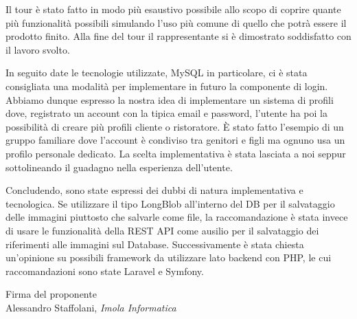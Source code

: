 \documentclass[a4paper, 11pt]{article}
\begin{document}
Il tour è stato fatto in modo più esaustivo possibile allo scopo di coprire quante più funzionalità possibili simulando l'uso più comune di quello che potrà essere il prodotto finito.
Alla fine del tour il rappresentante si è dimostrato soddisfatto con il lavoro svolto.

In seguito date le tecnologie utilizzate, MySQL in particolare, ci è stata consigliata una modalità per implementare in futuro la componente di login. Abbiamo dunque espresso la nostra idea di implementare un sistema di profili dove, registrato un account con la tipica email e password, l'utente ha poi la possibilità di creare più profili cliente o ristoratore. È stato fatto l'esempio di un gruppo familiare dove l'account è condiviso tra genitori e figli ma ognuno usa un profilo personale dedicato.
La scelta implementativa è stata lasciata a noi seppur sottolineando il guadagno nella esperienza dell'utente.

Concludendo, sono state espressi dei dubbi di natura implementativa e tecnologica.
Se utilizzare il tipo LongBlob all'interno del DB per il salvataggio delle immagini piuttosto che salvarle come file, la raccomandazione è stata invece di usare le funzionalità della REST API come ausilio per il salvataggio dei riferimenti alle immagini sul Database.
Successivamente è stata chiesta un'opinione su possibili framework da utilizzare lato backend con PHP, le cui raccomandazioni sono state Laravel e Symfony.

\vspace{60pt}
\begin{flushleft}
\hfill Firma del proponente \\
\vspace{50pt}
\hfill Alessandro Staffolani, \textit{Imola Informatica}
\end{flushleft}
\end{document}
